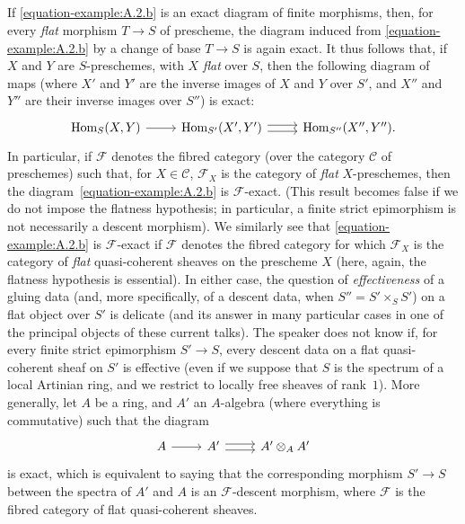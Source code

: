 \documentclass{article}
\theoremstyle{plain}
\theoremstyle{definition}
\newcommand{\sh}[1]{{\mathscr{#1}}}
\newcommand{\cat}[1]{{\mathcal{#1}}}
\DeclareMathOperator{\Hom}{Hom}
\newcommand{\oldpage}[1]{\marginpar{\footnotesize$\Big\vert$ \textit{p.~#1}}}
\begin{document}
\subsection{}
\label{A.2.c}

If \cref{equation-example:A.2.b} is an exact diagram of finite morphisms, then, for every \emph{flat} morphism $T\to S$ of prescheme, the diagram induced from \cref{equation-example:A.2.b} by a change of base $T\to S$ is again exact.
It thus follows that, if $X$ and $Y$ are $S$-preschemes, with $X$ \emph{flat} over $S$, then the following diagram of maps (where $X'$ and $Y'$ are the inverse images of $X$ and $Y$ over $S'$, and $X''$ and $Y''$ are their inverse images over $S''$) is exact:
\[
  \begin{tikzcd}
    \Hom_S(X,Y) \rar
    & \Hom_{S'}(X',Y') \rar[shift left=1] \rar[shift right=1]
    & \Hom_{S''}(X'',Y'').
  \end{tikzcd}
\]
In particular, if $\sh{F}$ denotes the fibred category (over the category $\cat{C}$ of preschemes) such that, for $X\in\cat{C}$, $\sh{F}_X$ is the category of \emph{flat} $X$-preschemes, then the diagram~\cref{equation-example:A.2.b} is $\sh{F}$-exact.
(This result becomes false if we do not impose the flatness hypothesis; in particular, a finite strict epimorphism is not necessarily a descent morphism).
We similarly see that \cref{equation-example:A.2.b} is $\sh{F}$-exact if $\sh{F}$ denotes the fibred category for which $\sh{F}_X$ is the category of \emph{flat} quasi-coherent sheaves on the prescheme $X$ (here, again, the
\oldpage{190-09}
flatness hypothesis is essential).
In either case, the question of \emph{effectiveness} of a gluing data (and, more specifically, of a descent data, when $S''=S'\times_S S'$) on a flat object over $S'$ is delicate (and its answer in many particular cases in one of the principal objects of these current talks).
The speaker does not know if, for every finite strict epimorphism $S'\to S$, every descent data on a flat quasi-coherent sheaf on $S'$ is effective (even if we suppose that $S$ is the spectrum of a local Artinian ring, and we restrict to locally free sheaves of rank~$1$).
More generally, let $A$ be a ring, and $A'$ an $A$-algebra (where everything is commutative) such that the diagram
\[
  \begin{tikzcd}
    A \rar
    & A' \rar[shift left=1] \rar[shift right=1]
    & A'\otimes_A A'
  \end{tikzcd}
\]
is exact, which is equivalent to saying that the corresponding morphism $S'\to S$ between the spectra of $A'$ and $A$ is an $\sh{F}$-descent morphism, where $\sh{F}$ is the fibred category of flat quasi-coherent sheaves.
\end{document}

